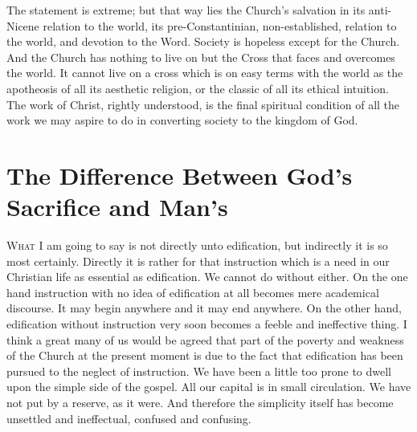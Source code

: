 \documentclass[12pt,a5paper,twoside,titlepage]{book}
\begin{document}
The statement is extreme; but that way lies 
the Church's salvation in its anti-Nicene relation 
to the world, its pre-Constantinian, non-established, relation to the world, and devotion 
to the Word. Society is hopeless except for the 
Church. And the Church has nothing to live on 
but the Cross that faces and overcomes the 
world. It cannot live on a cross which is on 
easy terms with the world as the apotheosis of 
all its aesthetic religion, or the classic of all its 
ethical intuition. The work of Christ, rightly 
understood, is the final spiritual condition of all 
the work we may aspire to do in converting 
society to the kingdom of God. 



\tableofcontents

\mainmatter

\chapter{The Difference Between God's Sacrifice and Man's}






\textsc{What} I am going to say is not directly unto 
edification, but indirectly it is so most 
certainly. Directly it is rather for that instruction 
which is a need in our Christian life as 
essential as edification. We cannot do without 
either. On the one hand instruction with no idea 
of edification at all becomes mere academical 
discourse. It may begin anywhere and it may 
end anywhere. On the other hand, edification 
without instruction very soon becomes a feeble 
and ineffective thing. I think a great many of 
us would be agreed that part of the poverty 
and weakness of the Church at the present 
moment is due to the fact that edification has 
been pursued to the neglect of instruction. We 
have been a little too prone to dwell upon the 
simple side of the gospel. All our capital is in
small circulation. We have not put by a reserve, 
as it were. And therefore the simplicity 
itself has become unsettled and ineffectual, confused 
and confusing. 
\end{document}
